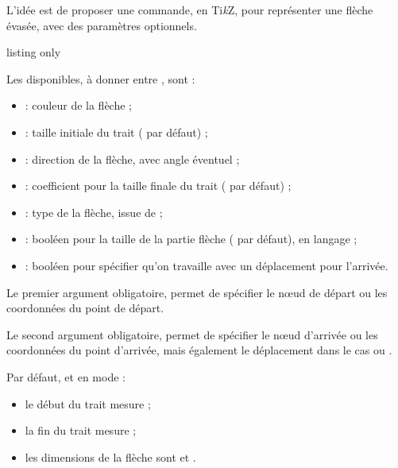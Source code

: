 \documentclass[french,11pt,a4paper]{article}
\providecommand\tikzlogo{Ti\textit{k}Z}
\let\TikZ\tikzlogo
\begin{document}
L'idée est de proposer une commande, en  \TikZ, pour représenter une flèche évasée, avec des paramètres optionnels.

\begin{DemoCode}{listing only}
\end{DemoCode}

\begin{DemoCode}{}
\end{DemoCode}

Les  disponibles, à donner entre \MontreCode{[...]}, sont :

\begin{itemize}
	\item {} : couleur de la flèche ;
	\item {} : taille initiale du trait (\MontreCode{0.5mm} par défaut) ;
	\item {} : direction de la flèche, avec angle éventuel ;
	\item {} : coefficient pour la taille finale du trait ( par défaut) ;
	\item {} : type de la flèche, issue de  ;
	\item {} : booléen pour la taille de la partie flèche ( par défaut), en langage  ;
	\item {} : booléen pour spécifier qu'on travaille avec un déplacement pour l'arrivée.
\end{itemize}

Le premier argument obligatoire, permet de spécifier le nœud de départ ou les coordonnées du point de départ.

Le second argument obligatoire, permet de spécifier le nœud d'arrivée ou les coordonnées du point d'arrivée, mais également le déplacement dans le cas ou .

\medskip

Par défaut, et en mode  :

\begin{itemize}
	\item le début du trait mesure  ;
	\item la fin du trait mesure  ;
	\item les dimensions de la flèche sont  et .
\end{itemize}
\end{document}
